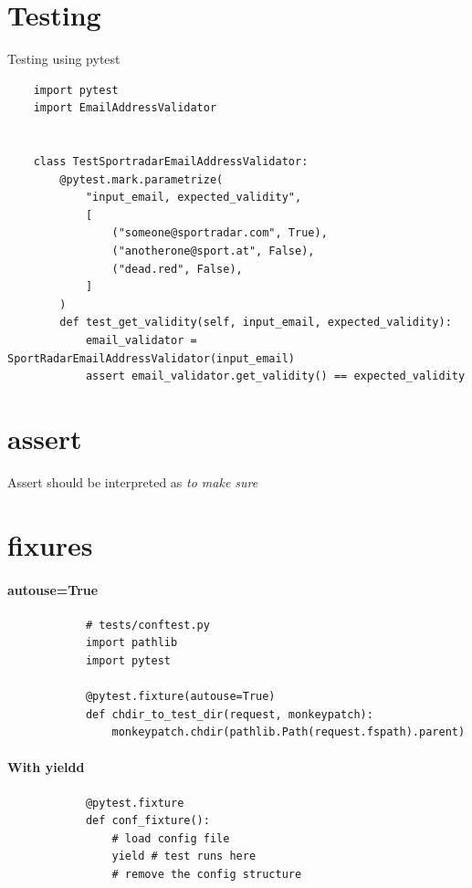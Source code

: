 \section{Testing}
Testing using pytest
\begin{verbatim}
    import pytest
    import EmailAddressValidator
    
    
    class TestSportradarEmailAddressValidator:
        @pytest.mark.parametrize(
            "input_email, expected_validity",
            [
                ("someone@sportradar.com", True),
                ("anotherone@sport.at", False),
                ("dead.red", False),
            ]
        )
        def test_get_validity(self, input_email, expected_validity):
            email_validator = SportRadarEmailAddressValidator(input_email)
            assert email_validator.get_validity() == expected_validity
\end{verbatim}

\section{assert}
Assert should be interpreted as \textit{to make sure}

\section{fixures}
    
    \paragraph{autouse=True}
        \begin{verbatim}
            # tests/conftest.py
            import pathlib
            import pytest
            
            @pytest.fixture(autouse=True)
            def chdir_to_test_dir(request, monkeypatch):
                monkeypatch.chdir(pathlib.Path(request.fspath).parent)
        \end{verbatim}
    \paragraph{With yieldd}
        \begin{verbatim}
            @pytest.fixture
            def conf_fixture():
                # load config file
                yield # test runs here
                # remove the config structure
        \end{verbatim}
        
